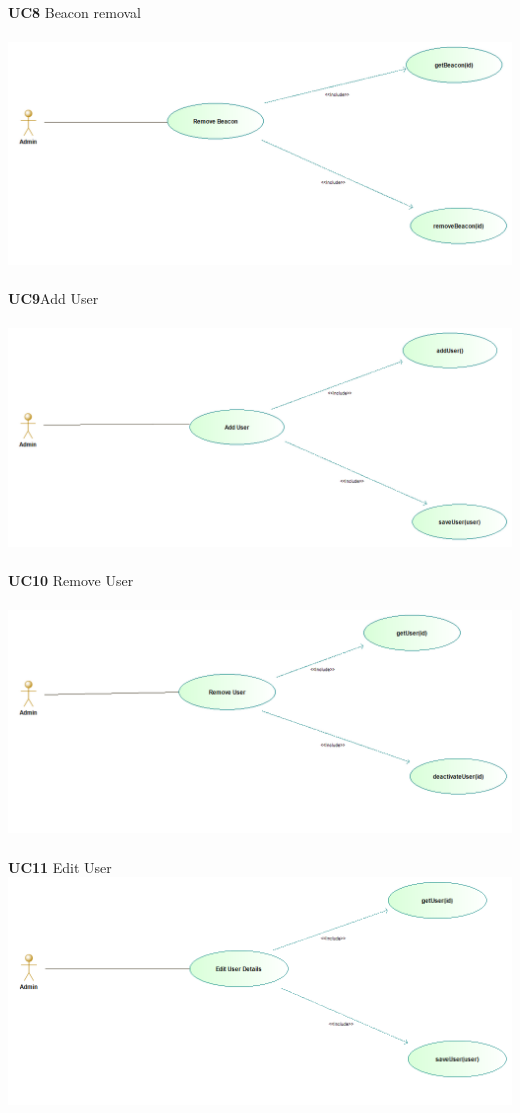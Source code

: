 \documentclass[11pt]{article}
\begin{document}
\textbf{UC8} Beacon removal\\\\
\includegraphics[scale=0.5]{./DiagramsTshepo/removeBeacon.png}\\\\
\textbf{UC9}Add User\\\\
\includegraphics[scale=0.5]{./DiagramsTshepo/addUser.png}\\\\
\textbf{UC10} Remove User\\\\
\includegraphics[scale=0.5]{./DiagramsTshepo/removeUser.png}\\\\
\textbf{UC11} Edit User \\
\includegraphics[scale=0.5]{./DiagramsTshepo/editUser.png}\\\\
\end{document}
